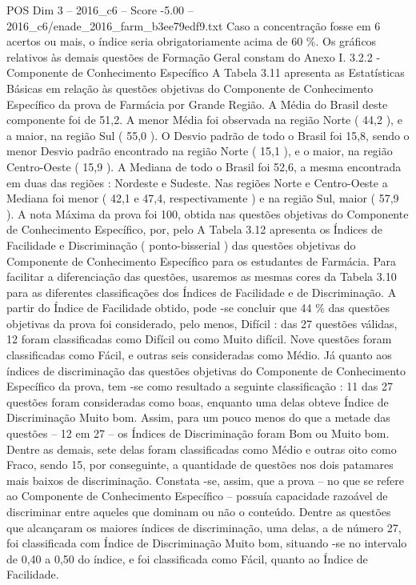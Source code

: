 \begin{textsample}{POS Dim 3 – 2016\_c6 – Score -5.00 – 2016\_c6/enade\_2016\_farm\_b3ee79edf9.txt}
Caso a concentração fosse em 6 acertos ou mais, o índice seria obrigatoriamente acima de 60 \%.
Os gráficos relativos às demais questões de Formação Geral constam do Anexo I. 3.2.2 - Componente de Conhecimento Específico A Tabela 3.11 apresenta as Estatísticas Básicas em relação às questões objetivas do Componente de Conhecimento Específico da prova de Farmácia por Grande Região.
A Média do Brasil deste componente foi de 51,2.
A menor Média foi observada na região Norte ( 44,2 ), e a maior, na região Sul ( 55,0 ).
O Desvio padrão de todo o Brasil foi 15,8, sendo o menor Desvio padrão encontrado na região Norte ( 15,1 ), e o maior, na região Centro-Oeste ( 15,9 ).
A Mediana de todo o Brasil foi 52,6, a mesma encontrada em duas das regiões : Nordeste e Sudeste.
Nas regiões Norte e Centro-Oeste a Mediana foi menor ( 42,1 e 47,4, respectivamente ) e na região Sul, maior ( 57,9 ).
A nota Máxima da prova foi 100, obtida nas questões objetivas do Componente de Conhecimento Específico, por, pelo A Tabela 3.12 apresenta os Índices de Facilidade e Discriminação ( ponto-bisserial ) das questões objetivas do Componente de Conhecimento Específico para os estudantes de Farmácia.
Para facilitar a diferenciação das questões, usaremos as mesmas cores da Tabela 3.10 para as diferentes classificações dos Índices de Facilidade e de Discriminação.
A partir do Índice de Facilidade obtido, pode -se concluir que 44 \% das questões objetivas da prova foi considerado, pelo menos, Difícil : das 27 questões válidas, 12 foram classificadas como Difícil ou como Muito difícil.
Nove questões foram classificadas como Fácil, e outras seis consideradas como Médio.
Já quanto aos índices de discriminação das questões objetivas do Componente de Conhecimento Específico da prova, tem -se como resultado a seguinte classificação : 11 das 27 questões foram consideradas como boas, enquanto uma delas obteve Índice de Discriminação Muito bom.
Assim, para um pouco menos do que a metade das questões – 12 em 27 – os Índices de Discriminação foram Bom ou Muito bom.
Dentre as demais, sete delas foram classificadas como Médio e outras oito como Fraco, sendo 15, por conseguinte, a quantidade de questões nos dois patamares mais baixos de discriminação.
Constata -se, assim, que a prova – no que se refere ao Componente de Conhecimento Específico – possuía capacidade razoável de discriminar entre aqueles que dominam ou não o conteúdo.
Dentre as questões que alcançaram os maiores índices de discriminação, uma delas, a de número 27, foi classificada com Índice de Discriminação Muito bom, situando -se no intervalo de 0,40 a 0,50 do índice, e foi classificada como Fácil, quanto ao Índice de Facilidade.

\end{textsample}
